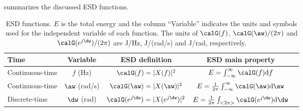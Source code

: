 %
%

 summarizes the discussed ESD functions.

\begin{table}
\centering
\caption{ESD functions. $E$ is the total energy and the column ``Variable'' indicates the units and symbols used for the independent variable of each function.
The units of $\calG(f)$, $\calG(\aw)/(2 \pi)$ and $\calG(e^{j\dw})/(2 \pi)$ are J/Hz, J/(rad/s) and J/rad, respectively.\label{tab:esd_functions}}
\begin{tabular}{|l|c|c|c|c|}
\hline
Time & Variable & ESD definition & ESD main property \\ \hline
Continuous-time & $f$ (Hz) & $\calG(f) = |X(f)|^2$ & $E = \int_{-\infty}^{\infty} \calG(f) \textrm{d}f$  \\ \hline
Continuous-time & $\aw$ (rad/s) & $\calG(\aw) = |X(\aw)|^2$ & $E=\frac{1}{2 \pi}\int_{-\infty}^{\infty} \calG(\aw) \textrm{d}\aw$  \\ \hline
Discrete-time & $\dw$ (rad) & $\calG(e^{j\dw}) = |X(e^{j\dw})|^2$ & $E=\frac{1}{2 \pi}\int_{<2 \pi>} \calG(e^{j\dw}) \textrm{d}\dw$  \\ \hline
\end{tabular}
\end{table}


